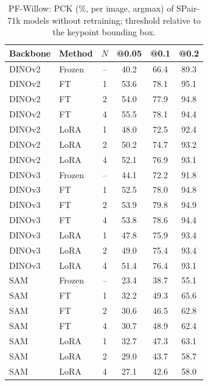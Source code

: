 \begin{table}[t]
\centering
\caption{PF-Willow: PCK (\%, per image, argmax) of SPair-71k models without retraining; threshold relative to the keypoint bounding box.}
\label{tab:pf_willow}
\small
\begin{tabular}{llcccc}
\toprule
Backbone & Method & $N$ & @0.05 & @0.1 & @0.2 \\
\midrule
DINOv2 & Frozen & -- & 40.2 & 66.4 & 89.3 \\
DINOv2 & FT & 1 & 53.6 & 78.1 & 95.1 \\
DINOv2 & FT & 2 & 54.0 & 77.9 & 94.8 \\
DINOv2 & FT & 4 & 55.5 & 78.1 & 94.4 \\
DINOv2 & LoRA & 1 & 48.0 & 72.5 & 92.4 \\
DINOv2 & LoRA & 2 & 50.2 & 74.7 & 93.2 \\
DINOv2 & LoRA & 4 & 52.1 & 76.9 & 93.1 \\
\midrule
DINOv3 & Frozen & -- & 44.1 & 72.2 & 91.8 \\
DINOv3 & FT & 1 & 52.5 & 78.0 & 94.8 \\
DINOv3 & FT & 2 & 53.9 & 79.8 & 94.9 \\
DINOv3 & FT & 4 & 53.8 & 78.6 & 94.4 \\
DINOv3 & LoRA & 1 & 47.8 & 75.9 & 93.4 \\
DINOv3 & LoRA & 2 & 49.0 & 75.4 & 93.4 \\
DINOv3 & LoRA & 4 & 51.4 & 76.4 & 93.1 \\
\midrule
SAM & Frozen & -- & 23.4 & 38.7 & 55.1 \\
SAM & FT & 1 & 32.2 & 49.3 & 65.6 \\
SAM & FT & 2 & 30.6 & 46.5 & 62.8 \\
SAM & FT & 4 & 30.7 & 48.9 & 62.4 \\
SAM & LoRA & 1 & 32.7 & 47.3 & 63.1 \\
SAM & LoRA & 2 & 29.0 & 43.7 & 58.7 \\
SAM & LoRA & 4 & 27.1 & 42.6 & 58.0 \\
\bottomrule
\end{tabular}
\end{table}
